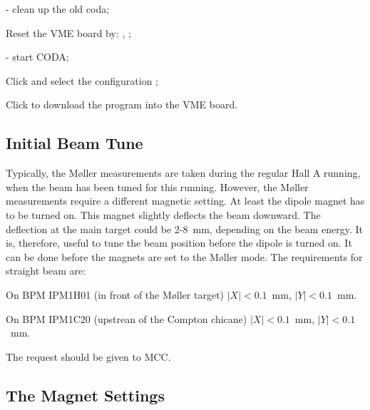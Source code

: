 {\begin{list}{--}{\setlength{\itemsep}{-0.15cm}}
   \item {} - clean up the old coda;
   \item Reset the VME board  by: , ;  
   \item {} - start CODA;
   \item Click  and select the configuration ;
   \item Click  to download the program into the VME board.
 \end{list}

\subsection {Initial Beam Tune}
\label{sec:moller_oper_initbeam}

 Typically, the M{\o}ller measurements are taken during the regular Hall A
 running, when the beam has been tuned for this running. However,
 the M{\o}ller measurements require a different magnetic setting.
 At least the dipole magnet has to be turned on. This magnet
 slightly deflects the beam downward. The deflection at the main target
 could be 2-8~mm, depending on the beam energy. It is, therefore, 
 useful to tune the beam position before the dipole is turned on. It can be done
 before the magnets are set to the M{\o}ller mode.
 The requirements for straight beam are: 
 \begin{list}{--}{\setlength{\itemsep}{-0.15cm}}
   \item On BPM IPM1H01 (in front of the M{\o}ller target) $|X|<0.1$~mm, $|Y|<0.1$~mm.
   \item On BPM IPM1C20 (upstrean of the Compton chicane)  $|X|<0.1$~mm, $|Y|<0.1$~mm.
 \end{list}
 The request should be given to MCC. 

\subsection {The Magnet Settings}
\label{sec:moller_oper_magset}

}

